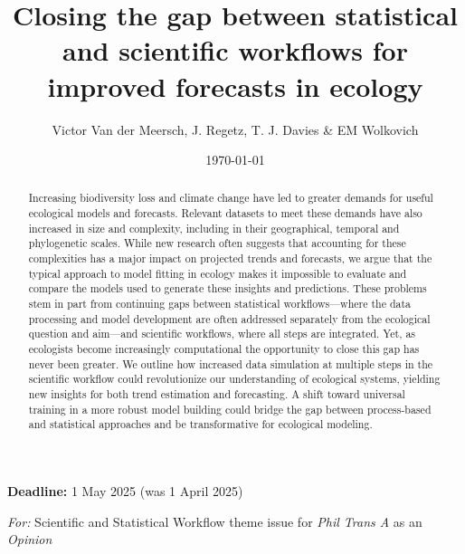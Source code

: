 \documentclass[11pt]{article}
\begin{document}
\title{Closing the gap between statistical and scientific workflows for improved forecasts in ecology } 
\date{\today}
\author{Victor Van der Meersch, J. Regetz, T. J. Davies \& EM Wolkovich}
\maketitle

{\bf Deadline:} 1 May 2025 (was 1 April 2025)

\emph{For:} Scientific and Statistical Workflow theme issue for \emph{Phil Trans A} as an \emph{Opinion}

\begin{abstract}
Increasing biodiversity loss and climate change have led to greater demands for useful ecological models and forecasts. Relevant datasets to meet these demands have also increased in size and complexity, including in their geographical, temporal and phylogenetic scales. While new research often suggests that accounting for these complexities has a major impact on projected trends and forecasts, we argue that the typical approach to model fitting in ecology makes it impossible to evaluate and compare the models used to generate these insights and predictions. %
These problems stem in part from continuing gaps between statistical workflows---where the data processing and model development are often addressed separately from the ecological question and aim---and scientific workflows, where all steps are integrated. Yet, as ecologists become increasingly computational the opportunity to close this gap has never been greater. We outline how increased data simulation at multiple steps in the scientific workflow could revolutionize our understanding of ecological systems, yielding new insights for both trend estimation and forecasting.
A shift toward universal training in a more robust model building could bridge the gap between process-based and statistical approaches and be transformative for ecological modeling.
\end{abstract}
\end{document}
